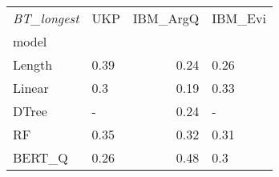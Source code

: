 \begin{tabular}{llrl}
\toprule
\textit{BT\_longest} &   UKP &  IBM\_ArgQ & IBM\_Evi \\
model  &       &           &         \\
\midrule
Length &  0.39 &      0.24 &    0.26 \\
Linear &   0.3 &      0.19 &    0.33 \\
DTree  &     - &      0.24 &       - \\
RF     &  0.35 &      0.32 &    0.31 \\
BERT\_Q &  0.26 &      0.48 &     0.3 \\
\bottomrule
\end{tabular}
